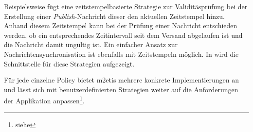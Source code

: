 Beispielsweise fügt eine zeitstempelbasierte Strategie zur Validitäsprüfung bei der Erstellung einer \emph{Publish}-Nachricht dieser den aktuellen Zeitstempel hinzu. Anhand diesem Zeitstempel kann bei der Prüfung einer Nachricht entschieden werden, ob ein entsprechendes Zeitintervall seit dem Versand abgelaufen ist und die Nachricht damit üngültig ist. Ein einfacher Ansatz zur Nachrichtensynchronisation ist ebenfalls mit Zeitstempeln möglich. In  wird die Schnittstelle für diese Strategien aufgezeigt.


Für jede einzelne Policy bietet \ac{m2etis} mehrere konkrete Implementierungen an und lässt sich mit benutzerdefinierten Strategien weiter auf die Anforderungen der Applikation anpassen\footnote{siehe }.
